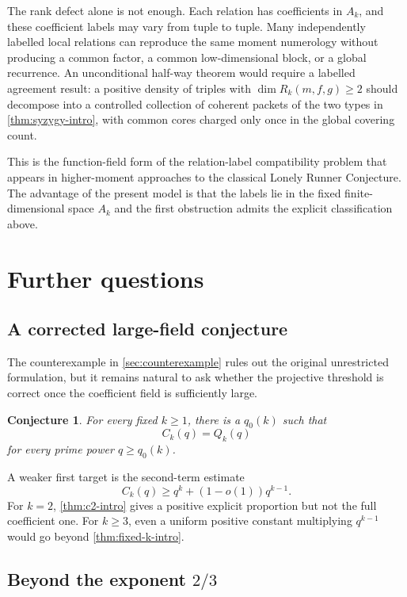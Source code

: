 \documentclass[11pt,reqno]{amsart}
\numberwithin{equation}{section}
\newtheorem{conjecture}[conjecture]{Conjecture}
\theoremstyle{definition}
\theoremstyle{remark}
\newcommand{\cR}{\mathcal R}
\def\mathcal#1{#1}%
\begin{document}
The rank defect alone is not enough.  Each relation has coefficients in
$A_k$, and these coefficient labels may vary from tuple to tuple.  Many independently labelled local relations can reproduce the same moment numerology without producing a common factor, a common low-dimensional block, or a global recurrence.  An unconditional half-way theorem would require a labelled agreement result: a positive density of triples with
$\dim\cR_k(m,f,g)\ge2$ should decompose into a controlled collection of coherent packets of the two types in
\cref{thm:syzygy-intro}, with common cores charged only once in the global covering count.

This is the function-field form of the relation-label compatibility problem that appears in higher-moment approaches to the classical Lonely Runner Conjecture.  The advantage of the present model is that the labels lie in the fixed finite-dimensional space $A_k$ and the first obstruction admits the explicit classification above.

\section{Further questions}\label{sec:open}

\subsection{A corrected large-field conjecture}

The counterexample in \cref{sec:counterexample} rules out the original unrestricted formulation, but it remains natural to ask whether the projective threshold is correct once the coefficient field is sufficiently large.

\begin{conjecture}\label{conj:asymptotic-CR}
For every fixed $k\ge1$, there is a $q_0(k)$ such that
\[
 C_k(q)=Q_k(q)
\]
for every prime power $q\ge q_0(k)$.
\end{conjecture}

A weaker first target is the second-term estimate
\[
 C_k(q)\ge q^k+(1-o(1))q^{k-1}.
\]
For $k=2$, \cref{thm:c2-intro} gives a positive explicit proportion but not the full coefficient one.  For $k\ge3$, even a uniform positive constant multiplying $q^{k-1}$ would go beyond \cref{thm:fixed-k-intro}.

\subsection{Beyond the exponent $2/3$}
\end{document}
